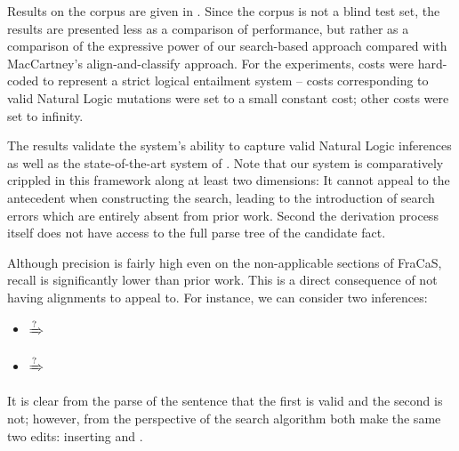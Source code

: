 Results on the corpus are given in .
Since the corpus is not a blind test set, the results are presented
  less as a comparison of performance, but rather as a comparison
  of the expressive power of our search-based approach compared with
  MacCartney's align-and-classify approach.
For the experiments, costs were hard-coded to represent a strict
  logical entailment system -- costs corresponding to valid Natural
  Logic mutations were set to a small constant cost; other costs
  were set to infinity.

The results validate the system's ability to capture valid Natural Logic
  inferences as well as the state-of-the-art system of
  .
Note that our system is comparatively crippled in this framework
  along at least two dimensions:
It cannot appeal to the antecedent when constructing the search,
  leading to the introduction of search errors which are entirely
  absent from prior work.
Second the derivation process itself does not have access to the
  full parse tree of the candidate fact.

Although precision is fairly high even on the non-applicable
  sections of FraCaS, recall is significantly lower than prior work.
This is a direct consequence of not having alignments to appeal to.
For instance, we can consider two inferences:

\begin{itemize}
\setlength{\itemsep}{0pt}
\item[]  $\xRightarrow{?}$ 
\item[]  $\xRightarrow{?}$ 
\end{itemize}

It is clear from the parse of the sentence that the first is valid
  and the second is not; however, from the perspective of the search
  algorithm both make the same two edits: inserting  and .

%

